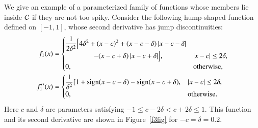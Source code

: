\documentclass[review]{elsarticle}
\theoremstyle{definition}
\DeclareMathOperator{\ninit}{ninit}
\begin{document}
We give an example of a parameterized family of functions whose members lie inside $\mathcal{C}$ if they are not too spiky. 
%
Consider the following hump-shaped function defined on $[-1,1]$, whose
second derivative has jump discontinuities:
\begin{align} \label{f3def}
f_1(x) & = \begin{cases} \displaystyle
   \frac{1}{2\delta^2} \Bigl [4 \delta^2 + (x-c)^2 + (x-c-\delta)\left \lvert x-c-\delta \right \rvert
\\ \qquad \qquad
    - (x-c+\delta)\left \lvert x-c+\delta \right \rvert \Bigr ], & \left \lvert x-c \right \rvert \le 2\delta,
\\ 0, & \text{otherwise},
\end{cases} \\
\nonumber
f''_1(x) & =
\begin{cases} \displaystyle
    \frac{1}{\delta^2} [1 + \operatorname{sign}(x-c-\delta) - \operatorname{sign}(x-c+\delta), & \left \lvert x-c \right \rvert \le 2\delta,
\\ 0, & \text{otherwise}.
\end{cases}
\end{align}
Here $c$ and $\delta$ are parameters satisfying $-1 \le c-2 \delta < c+ 2\delta
\le 1$. This function and its second derivative are shown in Figure~\ref{f3fig}
for $-c=\delta = 0.2$.
\end{document}
